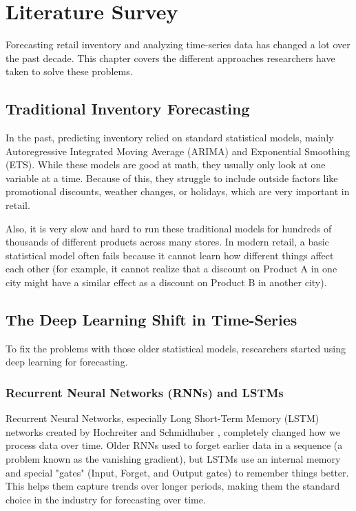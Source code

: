 \chapter{Literature Survey}
\label{chap:l_survey}

Forecasting retail inventory and analyzing time-series data has changed a lot over the past decade. This chapter covers the different approaches researchers have taken to solve these problems.

\section{Traditional Inventory Forecasting}

In the past, predicting inventory relied on standard statistical models, mainly Autoregressive Integrated Moving Average (ARIMA) and Exponential Smoothing (ETS). While these models are good at math, they usually only look at one variable at a time. Because of this, they struggle to include outside factors like promotional discounts, weather changes, or holidays, which are very important in retail.

Also, it is very slow and hard to run these traditional models for hundreds of thousands of different products across many stores. In modern retail, a basic statistical model often fails because it cannot learn how different things affect each other (for example, it cannot realize that a discount on Product A in one city might have a similar effect as a discount on Product B in another city).

\section{The Deep Learning Shift in Time-Series}

To fix the problems with those older statistical models, researchers started using deep learning for forecasting.

\subsection{Recurrent Neural Networks (RNNs) and LSTMs}
Recurrent Neural Networks, especially Long Short-Term Memory (LSTM) networks created by Hochreiter and Schmidhuber \cite{hochreiter1997long}, completely changed how we process data over time. Older RNNs used to forget earlier data in a sequence (a problem known as the vanishing gradient), but LSTMs use an internal memory and special "gates" (Input, Forget, and Output gates) to remember things better. This helps them capture trends over longer periods, making them the standard choice in the industry for forecasting over time.

